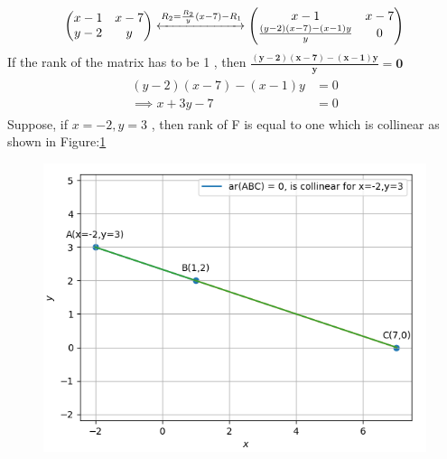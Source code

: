 \documentclass[12pt]{article}
\newcommand{\myvec}[1]{\ensuremath{\begin{pmatrix}#1\end{pmatrix}}}
\let\vec\mathbf
\begin{document}
\begin{align}
\label{eq:chem_balance_mat_row}
\myvec{
x-1 & x-7
\\
y-2 & y
}
	\xleftrightarrow[]{R_2 = \frac{R_2}{y}(x-7)-R_1}
\myvec{
x-1 & x-7
\\
	\frac{(y-2)(x-7)-(x-1)y}{y} & 0
}
\end{align}
If the rank of the matrix has to be 1 , then $\vec{\frac{(y-2)(x-7)-(x-1)y}{y}=0}$
\begin{align}
\begin{split}
	(y-2)(x-7)-(x-1)y &=0
\\
\implies x+3y-7 &=0 
\end{split}
\end{align}
Suppose, if $x=-2,y=3$ , then rank of F is equal to one which is collinear as shown in Figure:\ref    {fig:Fig}
\begin{figure}[!h]
	\begin{center} 
	    \includegraphics[width=\columnwidth]{./figs/sc1.png}
	\end{center}
\caption{}
\label{fig:Fig}
\end{figure}
\end{document}
